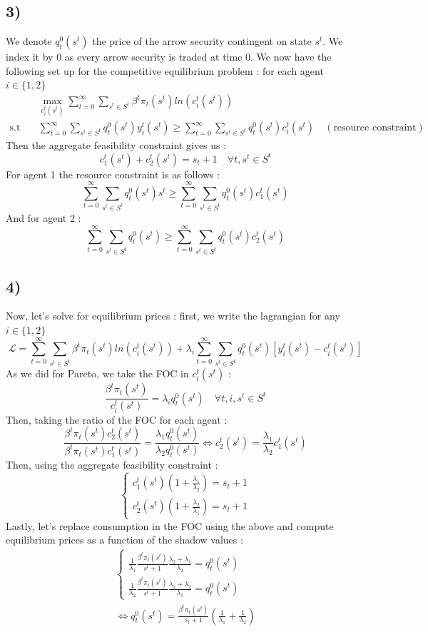 \documentclass{article}
\begin{document}
\subsection{3)}
We denote $q_t^0(s^t)$ the price of the arrow security contingent on state $s^t$. We index it by $0$ as every arrow security is traded at time $0$. 
We now have the following set up for the competitive equilibrium problem : for each agent $i\in \{1,2 \}$
$$\begin{aligned}
    &\max_{c_i^t(s^t)}\sum_{t=0}^\infty \sum_{s^t\in S^t}\beta^t \pi_t(s^t)ln(c_i^t(s^t))\\
    \text{s.t} \quad &\sum_{t=0}^\infty\sum_{s^t\in S^t}q_t^0(s^t)y_i^t(s^t)\geq  \sum_{t=0}^\infty\sum_{s^t\in S^t} q_t^0(s^t)c_i^t(s^t)\quad (\text{resource constraint})
\end{aligned}$$
Then the aggregate feasibility constraint gives us : $$c_1^t(s^t)+c_2^t(s^t)=s_t+1 \quad \forall t,s^t\in S^t $$
For agent 1 the resource constraint is as follows : 
$$\sum_{t=0}^\infty\sum_{s^t\in S^t}q_t^0(s^t)s^t\geq  \sum_{t=0}^\infty\sum_{s^t\in S^t} q_t^0(s^t)c_1^t(s^t)$$
And for agent 2 : 
$$\sum_{t=0}^\infty\sum_{s^t\in S^t}q_t^0(s^t)\geq  \sum_{t=0}^\infty\sum_{s^t\in S^t} q_t^0(s^t)c_2^t(s^t)$$

\subsection{4)}
Now, let's solve for equilibrium prices : first, we write the lagrangian for any $i\in \{1,2\}$
$$\mathcal{L}=\sum_{t=0}^\infty\sum_{s^t\in S^t}\beta^t\pi_t(s^t)ln(c_i^t(s^t))+\lambda_i\sum_{t=0}^\infty\sum_{s^t\in S^t}q_t^0(s^t)[y_i^t(s^t)-c_i^t(s^t)]$$
As we did for Pareto, we take the FOC in $c_i^t{(s^t)}$ : 
$$\frac{\beta^t\pi_t(s^t)}{c_i^t(s^t)}=\lambda_i q_t^0(s^t) \quad \forall t,i,s^t\in S^t$$
Then, taking the ratio of the FOC for each agent : 
$$\frac{\beta^t\pi_t(s^t)c_2^t(s^t)}{\beta^t\pi_t(s^t)c_1^t(s^t)}=\frac{\lambda_1q_t^0(s^t)}{\lambda_2q_t^0(s^t)}\Leftrightarrow c_2^t(s^t) =\frac{\lambda_1}{\lambda_2}c_1^t(s^t)$$
Then, using the aggregate feasibility constraint : 
$$\left\{\begin{aligned}
    c_1^t(s^t)(1+\frac{\lambda_1}{\lambda_2})=s_t+1\\
    c_2^t(s^t)(1+\frac{\lambda_2}{\lambda_1})=s_t+1
\end{aligned} \right.$$
Lastly, let's replace consumption in the FOC using the above and compute equilibrium prices as a function of the shadow values : 
$$\begin{aligned}
    \left\{\begin{aligned}
        \frac{1}{\lambda_1}\frac{\beta^t\pi_t(s^t)}{s^t+1}\frac{\lambda_2+\lambda_1}{\lambda_2} = q_t^0(s^t)\\
        \frac{1}{\lambda_2}\frac{\beta^t\pi_t (s^t)}{s^t+1}\frac{\lambda_1+\lambda_2}{\lambda_1}=q_t^0(s^t)
    \end{aligned} \right.\\
    \Leftrightarrow q_t^0(s^t) = \frac{\beta^t\pi_t(s^t)}{s_t+1}(\frac{1}{\lambda_1}+\frac{1}{\lambda_2})
\end{aligned}$$
\end{document}
